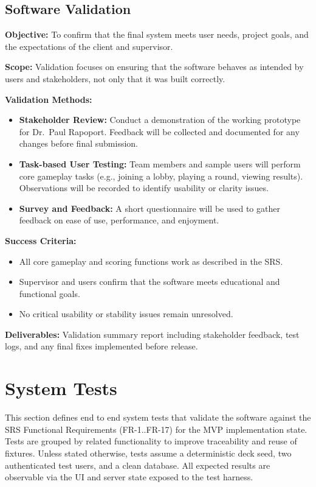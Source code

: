 \documentclass[12pt, titlepage]{article}
\begin{document}
\subsection{Software Validation}

\noindent\textbf{Objective:}  
To confirm that the final system meets user needs, project goals, and the expectations of the client and supervisor.

\noindent\textbf{Scope:}  
Validation focuses on ensuring that the software behaves as intended by users and stakeholders, not only that it was built correctly.

\noindent\textbf{Validation Methods:}
\begin{itemize}
    \item \textbf{Stakeholder Review:}  
    Conduct a demonstration of the working prototype for Dr.\ Paul Rapoport.  
    Feedback will be collected and documented for any changes before final submission.
    
    \item \textbf{Task-based User Testing:}  
    Team members and sample users will perform core gameplay tasks (e.g., joining a lobby, playing a round, viewing results).  
    Observations will be recorded to identify usability or clarity issues.

    \item \textbf{Survey and Feedback:}  
    A short questionnaire will be used to gather feedback on ease of use, performance, and enjoyment.
\end{itemize}

\noindent\textbf{Success Criteria:}
\begin{itemize}
    \item All core gameplay and scoring functions work as described in the SRS.  
    \item Supervisor and users confirm that the software meets educational and functional goals.  
    \item No critical usability or stability issues remain unresolved.
\end{itemize}

\noindent\textbf{Deliverables:}  
Validation summary report including stakeholder feedback, test logs, and any final fixes implemented before release.


\section{System Tests}

This section defines end to end system tests that validate the software against the SRS Functional Requirements (FR-1..FR-17) for the MVP implementation state. Tests are grouped by related functionality to improve traceability and reuse of fixtures. Unless stated otherwise, tests assume a deterministic deck seed, two authenticated test users, and a clean database. All expected results are observable via the UI and server state exposed to the test harness.
\end{document}
